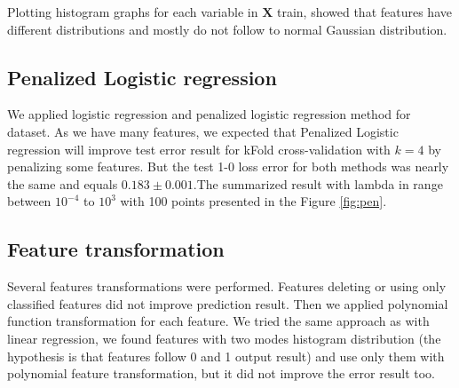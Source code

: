 \documentclass{article} %
\begin{document}
Plotting histogram graphs for each variable in $\mathbf{X}$ train, showed that features have different distributions and mostly do not follow to normal Gaussian distribution.

\begin{figure}[!t]
\center
{}
\hfill
\caption{}
\end{figure}

\subsection{Penalized Logistic regression}
We applied logistic regression and penalized logistic regression method for dataset. As we have many features, we expected that Penalized Logistic regression will improve test error result for kFold cross-validation with $k=4$ by penalizing some features. But the test 1-0 loss error for both methods was nearly the same and equals $0.183\pm0.001$.The summarized result with lambda in range between $10^{-4}$ to $10^3$  with 100 points presented in the Figure \ref{fig:pen}. 

\subsection{Feature transformation}
Several features transformations were performed. Features deleting or using only classified features did not improve prediction result. Then we applied polynomial function transformation for each feature. We tried the same approach as with linear regression, we found features with two modes histogram distribution (the hypothesis is that features follow 0 and 1 output result) and use only them with polynomial feature transformation, but it did not improve the error result too.
\end{document}
